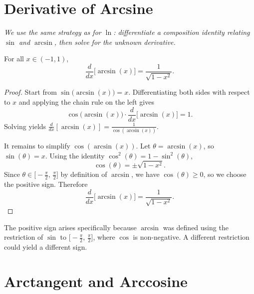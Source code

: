 \section{Derivative of Arcsine}
\label{sec:4.13}

\textit{We use the same strategy as for $\ln$: differentiate a composition identity relating $\sin$ and $\arcsin$, then solve for the unknown derivative.}

\begin{theorem}
\label{thm:4-8}
For all $x \in (-1,1)$,
\[
  \frac{d}{dx}\bigl[\arcsin(x)\bigr] = \frac{1}{\sqrt{1 - x^{2}}}.
\]
\end{theorem}

\begin{proof}
Start from $\sin\!\bigl(\arcsin(x)\bigr) = x$.  Differentiating both sides with respect to $x$ and applying the chain rule on the left gives
\[
  \cos\!\bigl(\arcsin(x)\bigr) \cdot \frac{d}{dx}\bigl[\arcsin(x)\bigr] = 1.
\]
Solving yields $\frac{d}{dx}[\arcsin(x)] = \frac{1}{\cos(\arcsin(x))}$.

It remains to simplify $\cos(\arcsin(x))$.  Let $\theta = \arcsin(x)$, so $\sin(\theta) = x$.  Using the identity $\cos^{2}(\theta) = 1 - \sin^{2}(\theta)$,
\[
  \cos(\theta) = \pm\sqrt{1 - x^{2}}.
\]
Since $\theta \in \bigl[-\frac{\pi}{2},\, \frac{\pi}{2}\bigr]$ by definition of $\arcsin$, we have $\cos(\theta) \geq 0$, so we choose the positive sign.  Therefore
\[
  \frac{d}{dx}\bigl[\arcsin(x)\bigr] = \frac{1}{\sqrt{1 - x^{2}}}.
\]
\end{proof}

\begin{remark}
The positive sign arises specifically because $\arcsin$ was defined using the restriction of $\sin$ to $\bigl[-\frac{\pi}{2},\, \frac{\pi}{2}\bigr]$, where $\cos$ is non-negative.  A different restriction could yield a different sign.
\end{remark}

\section{Arctangent and Arccosine}
\label{sec:4.14}

